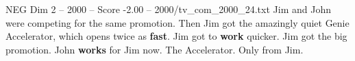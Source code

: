 \begin{textsample}{NEG Dim 2 – 2000 – Score -2.00 – 2000/tv\_com\_2000\_24.txt}  \label{ex:f2_neg_003}
Jim and John were competing for the same promotion.
Then Jim got the amazingly quiet Genie Accelerator, which opens twice as \textbf{fast}.
Jim got to \textbf{work} quicker.
Jim got the big promotion.
John \textbf{works} for Jim now.
The Accelerator.
Only from Jim.

\end{textsample}
